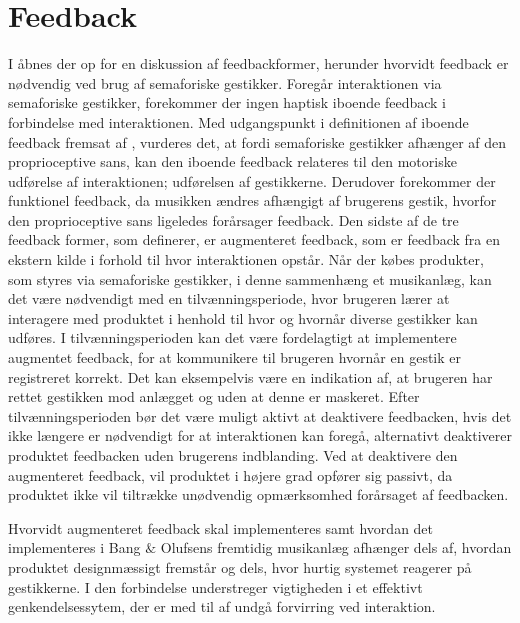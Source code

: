 \section{Feedback}
\label{DiskussionFeedback}
%
I  åbnes der op for en diskussion af feedbackformer, herunder hvorvidt feedback er nødvendig ved brug af semaforiske gestikker. Foregår interaktionen via semaforiske gestikker, forekommer der ingen haptisk iboende feedback i forbindelse med interaktionen. Med udgangspunkt i definitionen af iboende feedback fremsat af \textcite[s. 3]{PDF:InteractionFrogger}, vurderes det, at fordi semaforiske gestikker afhænger af den proprioceptive sans, kan den iboende feedback relateres til den motoriske udførelse af interaktionen; udførelsen af gestikkerne. Derudover forekommer der funktionel feedback, da musikken ændres afhængigt af brugerens gestik, hvorfor den proprioceptive sans ligeledes forårsager feedback. Den sidste af de tre feedback former, som  \textcite[s. 3]{PDF:InteractionFrogger} definerer, er augmenteret feedback, som er feedback fra en ekstern kilde i forhold til hvor interaktionen opstår.\blankline
%
Når der købes produkter, som styres via semaforiske gestikker, i denne sammenhæng et musikanlæg, kan det være nødvendigt med en tilvænningsperiode, hvor brugeren lærer at interagere med produktet i henhold til hvor og hvornår diverse gestikker kan udføres. I tilvænningsperioden kan det være fordelagtigt at implementere augmentet feedback, for at kommunikere til brugeren hvornår en gestik er registreret korrekt. Det kan eksempelvis være en indikation af, at brugeren har rettet gestikken mod anlægget og uden at denne er maskeret. Efter tilvænningsperioden bør det være muligt aktivt at deaktivere feedbacken, hvis det ikke længere er nødvendigt for at interaktionen kan foregå, alternativt deaktiverer produktet feedbacken uden brugerens indblanding. Ved at deaktivere den augmenteret feedback, vil produktet i højere grad opfører sig passivt, da produktet ikke vil tiltrække unødvendig opmærksomhed forårsaget af feedbacken.

Hvorvidt augmenteret feedback skal implementeres samt hvordan det implementeres i Bang $\&$ Olufsens fremtidig musikanlæg afhænger dels af, hvordan produktet designmæssigt fremstår og dels, hvor hurtig systemet reagerer på gestikkerne. I den forbindelse understreger \textcite[s. 8]{PDF:AChairAsUbiquitousInputDevice} vigtigheden i et effektivt genkendelsessytem, der er med til af undgå forvirring ved interaktion. 

